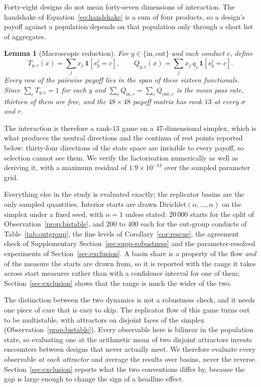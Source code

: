 \documentclass[preprint,12pt]{elsarticle}
\theoremstyle{plain}
\newtheorem{lemma}[theorem]{Lemma}
\theoremstyle{definition}
\begin{document}
Forty-eight designs do not mean forty-seven dimensions of interaction. The
handshake of Equation~\eqref{eq:handshake} is a sum of four products, so a
design's payoff against a population depends on that population only through a
short list of aggregates.

\begin{lemma}[Macroscopic reduction]
\label{lem:rank}
For $y \in \{\mathrm{in}, \mathrm{out}\}$ and each conduct $c$, define
\begin{equation}
\label{eq:macro}
T_{y,c}(x) = \sum_{j} x_j\,\mathbf{1}\!\left[s^{j}_{y} = c\right],
\qquad
Q_{y,c}(x) = \sum_{j} x_j\, q_j\,\mathbf{1}\!\left[s^{j}_{y} = c\right].
\end{equation}
Every row of the pairwise payoff lies in the span of these sixteen functionals.
Since $\sum_c T_{y,c} = 1$ for each $y$ and $\sum_c Q_{\mathrm{in},c} =
\sum_c Q_{\mathrm{out},c}$ is the mean pass rate, thirteen of them are free, and
the $48 \times 48$ payoff matrix has rank $13$ at every $\sigma$ and $r$.
\end{lemma}

The interaction is therefore a rank-$13$ game on a $47$-dimensional simplex,
which is what produces the neutral directions and the continua of rest points
reported below: thirty-four directions of the state space are invisible to
every payoff, so selection cannot see them. We verify the factorisation
numerically as well as deriving it, with a maximum residual of
$1.9 \times 10^{-13}$ over the sampled parameter grid.

Everything else in the study is evaluated exactly; the replicator basins are
the only sampled quantities. Interior
starts are drawn $\mathrm{Dirichlet}(\alpha, \dots, \alpha)$ on the simplex
under a fixed seed, with $\alpha = 1$ unless stated: $20\,000$ starts for the
split of Observation~\ref{prop:bistable}, and $200$ to $400$ each for the
out-group conducts of Table~\ref{tab:outgroup}, the fine levels of
Corollary~\ref{cor:rescue}, the agreement check of
Supplementary Section~\ref{sec:supp-robustness} and the parameter-resolved experiments of
Section~\ref{sec:exclusion}. A basin share is a property of the flow
\emph{and} of the measure the starts are drawn from, so it is reported with the
range it takes across start measures rather than with a confidence interval for
one of them; Section~\ref{sec:exclusion} shows that the range is much the wider
of the two.

The distinction between the two dynamics is not a robustness check, and it
needs one
piece of care that is easy to skip. The replicator flow of this game turns out
to be multistable, with attractors on disjoint faces of the simplex
(Observation~\ref{prop:bistable}). Every observable here is bilinear in the
population state, so evaluating one at the arithmetic mean of two disjoint
attractors invents encounters between designs that never actually meet. We
therefore evaluate every observable \emph{at each attractor} and average the
results over basins, never the reverse. Section~\ref{sec:exclusion} reports
what the two conventions differ by, because the gap is large enough to change
the sign of a headline effect.
\end{document}
